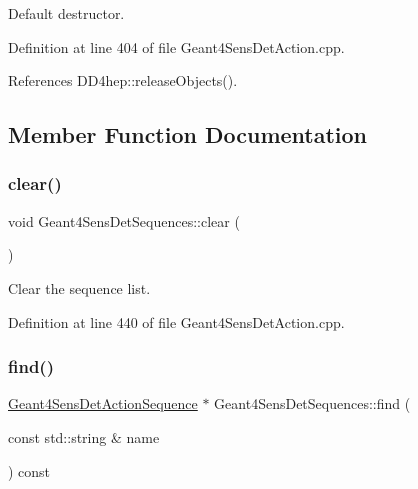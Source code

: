 Default destructor. 



Definition at line 404 of file Geant4\+Sens\+Det\+Action.\+cpp.



References D\+D4hep\+::release\+Objects().



\subsection{Member Function Documentation}
\hypertarget{class_d_d4hep_1_1_simulation_1_1_geant4_sens_det_sequences_ad30860ebb23e7fbbaf18c8a7194ae6cc}{}\label{class_d_d4hep_1_1_simulation_1_1_geant4_sens_det_sequences_ad30860ebb23e7fbbaf18c8a7194ae6cc} 
\subsubsection{\texorpdfstring{clear()}{clear()}}
{\footnotesize\ttfamily void Geant4\+Sens\+Det\+Sequences\+::clear (\begin{DoxyParamCaption}{ }\end{DoxyParamCaption})}



Clear the sequence list. 



Definition at line 440 of file Geant4\+Sens\+Det\+Action.\+cpp.

\hypertarget{class_d_d4hep_1_1_simulation_1_1_geant4_sens_det_sequences_adee9e588585b3a8079dc40b1fd171b3c}{}\label{class_d_d4hep_1_1_simulation_1_1_geant4_sens_det_sequences_adee9e588585b3a8079dc40b1fd171b3c} 
\subsubsection{\texorpdfstring{find()}{find()}}
{\footnotesize\ttfamily \hyperlink{class_d_d4hep_1_1_simulation_1_1_geant4_sens_det_action_sequence}{Geant4\+Sens\+Det\+Action\+Sequence} $\ast$ Geant4\+Sens\+Det\+Sequences\+::find (\begin{DoxyParamCaption}\item[{const std\+::string \&}]{name }\end{DoxyParamCaption}) const}




